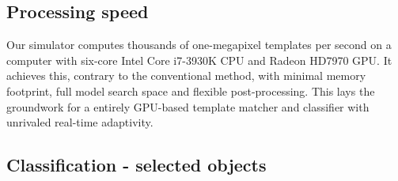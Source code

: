 \subsection{Processing speed}

%


Our simulator computes thousands of one-megapixel templates per second on a computer with six-core Intel Core i7-3930K CPU and Radeon HD7970 GPU. It achieves this, contrary to the conventional method, with  minimal memory footprint, full model search space and flexible post-processing. This lays the groundwork for a entirely GPU-based template matcher and classifier with unrivaled real-time adaptivity.






\subsection{Classification - selected objects}


